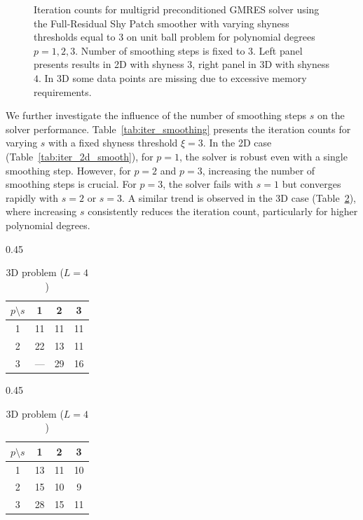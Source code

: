 \documentclass{elsarticle}
\begin{document}
\begin{figure}[htbp]
    \centering
    
    \caption{Iteration counts for multigrid preconditioned GMRES solver using the Full-Residual Shy Patch smoother with
        varying shyness thresholds equal to 3 on unit ball problem for polynomial degrees $p=1,2,3$. Number of smoothing steps is fixed to 3. Left panel presents results in 2D with shyness $3$, right panel in 3D with shyness $4$. In 3D some data points are missing due to excessive memory requirements.}
    \label{fig:iteration_counts_shy3_smoothing3}
\end{figure}

We further investigate the influence of the number of smoothing steps $s$ on the solver performance.
Table~\ref{tab:iter_smoothing} presents the iteration counts for varying $s$ with a fixed shyness threshold $\xi=3$. In
the 2D case (Table~\ref{tab:iter_2d_smooth}), for $p=1$, the solver is robust even with a single smoothing step.
However, for $p=2$ and $p=3$, increasing the number of smoothing steps is crucial. For $p=3$, the solver fails with
$s=1$ but converges rapidly with $s=2$ or $s=3$. A similar trend is observed in the 3D case
(Table~\ref{tab:iter_3d_smooth}), where increasing $s$ consistently reduces the iteration count, particularly for
higher polynomial degrees.

\begin{table}[htbp]
    \centering
    \caption{Iteration counts for varying smoothing steps $s$ with fixed shyness threshold $\xi=3$. Left: 2D problem ($L=8$). Right: 3D problem ($L=4$).}
    \label{tab:iter_smoothing}

    \begin{subtable}{0.45\textwidth}
        \centering
        \caption{2D problem ($L=8$)}
        \label{tab:iter_2d_smooth}
        \begin{tabular}{c|ccc}
            \toprule
            $p \setminus s$ & 1   & 2  & 3  \\
            \midrule
            1               & 11  & 11 & 11 \\
            2               & 22  & 13 & 11 \\
            3               & --- & 29 & 16 \\
            \bottomrule
        \end{tabular}
    \end{subtable}
    \begin{subtable}{0.45\textwidth}
        \centering
        \caption{3D problem ($L=4$)}
        \label{tab:iter_3d_smooth}
        \begin{tabular}{c|ccc}
            \toprule
            $p \setminus s$ & 1  & 2  & 3  \\
            \midrule
            1               & 13 & 11 & 10 \\
            2               & 15 & 10 & 9  \\
            3               & 28 & 15 & 11 \\
            \bottomrule
        \end{tabular}
    \end{subtable}
\end{table}
\end{document}
